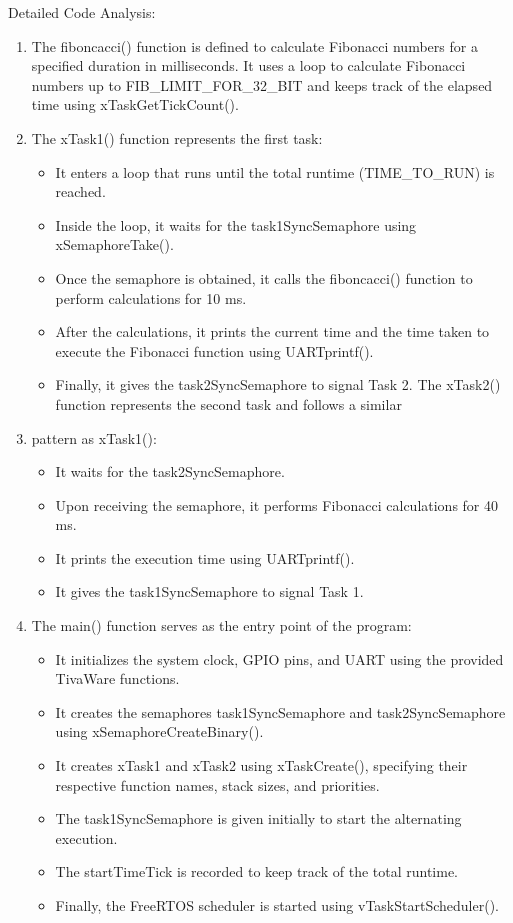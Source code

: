 \documentclass[a4paper,11pt]{article}%
\newenvironment{qanda}{\setlength{\parindent}{0pt}}{\bigskip}
\begin{document}
\begin{qanda}
Detailed Code Analysis:
\begin{enumerate}
	\item The fiboncacci() function is defined to calculate Fibonacci numbers for a specified duration in milliseconds. It uses a loop to calculate Fibonacci numbers up to FIB\_LIMIT\_FOR\_32\_BIT and keeps track of the elapsed time using xTaskGetTickCount().
	\item The xTask1() function represents the first task:
	\begin{itemize}
		\item It enters a loop that runs until the total runtime (TIME\_TO\_RUN) is reached.
		\item Inside the loop, it waits for the task1SyncSemaphore using xSemaphoreTake().
		\item Once the semaphore is obtained, it calls the fiboncacci() function to perform calculations for 10 ms.
		\item After the calculations, it prints the current time and the time taken to execute the Fibonacci function using UARTprintf().
		\item Finally, it gives the task2SyncSemaphore to signal Task 2.
		The xTask2() function represents the second task and follows a similar 
	\end{itemize}
	\item pattern as xTask1():
	\begin{itemize}
		\item It waits for the task2SyncSemaphore.
		\item Upon receiving the semaphore, it performs Fibonacci calculations for 40 ms.
		\item It prints the execution time using UARTprintf().
		\item It gives the task1SyncSemaphore to signal Task 1.
	\end{itemize}
	
	\item The main() function serves as the entry point of the program:
	\begin{itemize}
		\item It initializes the system clock, GPIO pins, and UART using the provided TivaWare functions.
		\item It creates the semaphores task1SyncSemaphore and task2SyncSemaphore using xSemaphoreCreateBinary().
		\item It creates xTask1 and xTask2 using xTaskCreate(), specifying their respective function names, stack sizes, and priorities.
		\item The task1SyncSemaphore is given initially to start the alternating execution.
		\item The startTimeTick is recorded to keep track of the total runtime.
		\item 
		Finally, the FreeRTOS scheduler is started using vTaskStartScheduler().
		

\end{itemize}
\end{enumerate}
\end{qanda}
\end{document}
